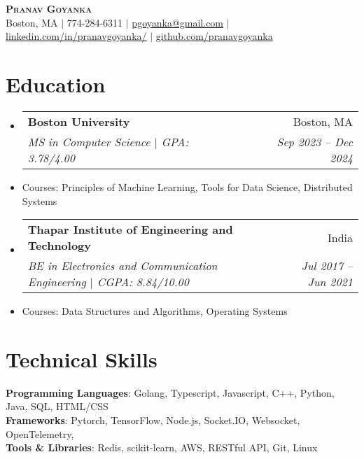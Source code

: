 \documentclass[letterpaper,11pt]{article}
\makeatletter
\newcommand{\resumeItem}[1]{
  \item\small{
    {#1 \vspace{-2pt}}
  }
}
\newcommand{\resumeSubheading}[4]{
  \vspace{-2pt}\item
    \begin{tabular*}{0.97\textwidth}[t]{l@{\extracolsep{\fill}}r}
      \textbf{#1} & #2 \\
      \textit{\small#3} & \textit{\small #4} \\
    \end{tabular*}\vspace{-7pt}
}
\newcommand{\resumeSubHeadingListStart}{\begin{itemize}[leftmargin=0.15in, label={}]}
\newcommand{\resumeSubHeadingListEnd}{\end{itemize}}
\makeatother
\begin{document}

\begin{center}
    \textbf{\Huge \scshape Pranav Goyanka} \\ \vspace{1pt}
    \small Boston, MA $|$
    \small 774-284-6311 $|$ \href{mailto:pgoyanka@gmail.com}{\underline{pgoyanka@gmail.com}} $|$ 
    \href{https://www.linkedin.com/in/pranavgoyanka/}{\underline{linkedin.com/in/pranavgoyanka/}} $|$
    \href{https://github.com/pranavgoyanka/}{\underline{github.com/pranavgoyanka}}
\end{center}

\section{Education}
  \resumeSubHeadingListStart
    \resumeSubheading
      {Boston University}{Boston, MA}
      {MS in Computer Science $|$ GPA: 3.78/4.00 }{Sep 2023 -- Dec 2024}
      \resumeItem{Courses: Principles of Machine Learning, Tools for Data Science, Distributed Systems}
    \resumeSubheading
      {Thapar Institute of Engineering and Technology}{India}
      {BE in Electronics and Communication Engineering $|$ CGPA: 8.84/10.00 }{Jul 2017 -- Jun 2021}
      \resumeItem{Courses: Data Structures and Algorithms, Operating Systems}
  \resumeSubHeadingListEnd

\section{Technical Skills}
 \begin{itemize}[leftmargin=0.15in, label={}]
    \small{\item{
     \textbf{Programming Languages}{: Golang, Typescript, Javascript, C++, Python, Java,  SQL, HTML/CSS} \\
     \textbf{Frameworks}{: Pytorch, TensorFlow, Node.js, Socket.IO, Websocket, OpenTelemetry, } \\
     \textbf{Tools \& Libraries}{: Redis, scikit-learn, AWS, RESTful API, Git, Linux} \\
    }}
 \end{itemize}

\end{document}
